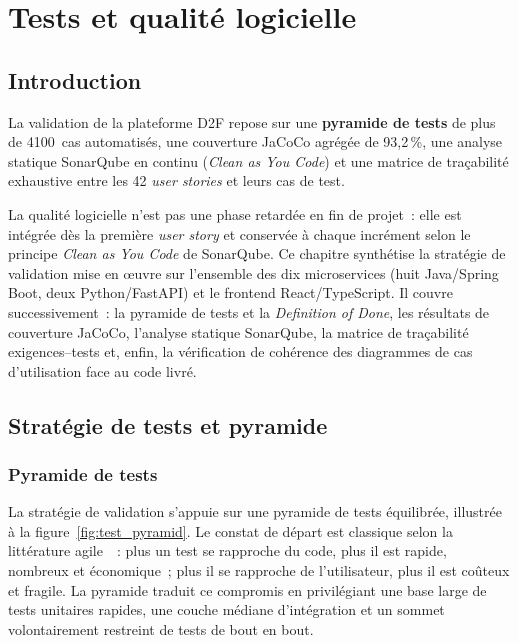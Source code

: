 \documentclass[12pt,a4paper]{report}
\begin{document}
\chapter{Tests et qualité logicielle}
\label{chap:tests}

\section{Introduction}

\begin{summaryframe}[frametitle={En bref — Tests et qualité}]
La validation de la plateforme D2F repose sur une \textbf{pyramide de tests} de
plus de 4100~cas automatisés, une couverture JaCoCo agrégée de 93,2\,\%, une
analyse statique SonarQube en continu (\emph{Clean as You Code}) et une matrice
de traçabilité exhaustive entre les 42 \textit{user stories} et leurs cas de test.
\end{summaryframe}

La qualité logicielle n'est pas une phase retardée en fin de projet~: elle est
intégrée dès la première \textit{user story} et conservée à chaque incrément
selon le principe \emph{Clean as You Code} de SonarQube. Ce chapitre synthétise
la stratégie de validation mise en \oe{}uvre sur l'ensemble des dix microservices
(huit Java/Spring Boot, deux Python/FastAPI) et le frontend React/TypeScript.
Il couvre successivement~: la pyramide de tests et la \emph{Definition of Done},
les résultats de couverture JaCoCo, l'analyse statique SonarQube, la matrice de
traçabilité exigences--tests et, enfin, la vérification de cohérence des
diagrammes de cas d'utilisation face au code livré.

\section{Stratégie de tests et pyramide}

\subsection{Pyramide de tests}

La stratégie de validation s'appuie sur une pyramide de tests équilibrée,
illustrée à la figure~\ref{fig:test_pyramid}. Le constat de départ est
classique selon la littérature agile~\cite{cohn2009succeeding}~: plus un test
se rapproche du code, plus il est rapide, nombreux et économique~; plus il se
rapproche de l'utilisateur, plus il est coûteux et fragile. La pyramide traduit
ce compromis en privilégiant une base large de tests unitaires rapides, une
couche médiane d'intégration et un sommet volontairement restreint de tests de
bout en bout.
\end{document}
